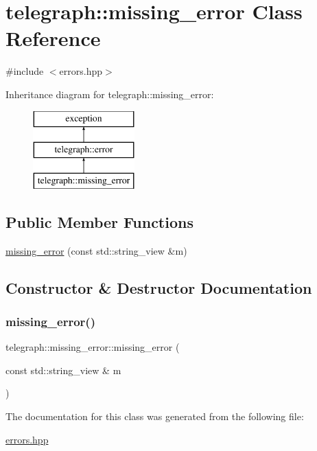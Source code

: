 \hypertarget{classtelegraph_1_1missing__error}{}\section{telegraph\+:\+:missing\+\_\+error Class Reference}
\label{classtelegraph_1_1missing__error}


{\ttfamily \#include $<$errors.\+hpp$>$}

Inheritance diagram for telegraph\+:\+:missing\+\_\+error\+:\begin{figure}[H]
\begin{center}
\leavevmode
\includegraphics[height=3.000000cm]{classtelegraph_1_1missing__error}
\end{center}
\end{figure}
\subsection*{Public Member Functions}
\begin{DoxyCompactItemize}
\item 
\hyperlink{classtelegraph_1_1missing__error_a886bea805b734808fee6f0066375480c}{missing\+\_\+error} (const std\+::string\+\_\+view \&m)
\end{DoxyCompactItemize}


\subsection{Constructor \& Destructor Documentation}
\mbox{\label{classtelegraph_1_1missing__error_a886bea805b734808fee6f0066375480c}} 
\subsubsection{\texorpdfstring{missing\+\_\+error()}{missing\_error()}}
{\footnotesize\ttfamily telegraph\+::missing\+\_\+error\+::missing\+\_\+error (\begin{DoxyParamCaption}\item[{const std\+::string\+\_\+view \&}]{m }\end{DoxyParamCaption})\hspace{0.3cm}{\ttfamily [inline]}}



The documentation for this class was generated from the following file\+:\begin{DoxyCompactItemize}
\item 
\hyperlink{errors_8hpp}{errors.\+hpp}\end{DoxyCompactItemize}
